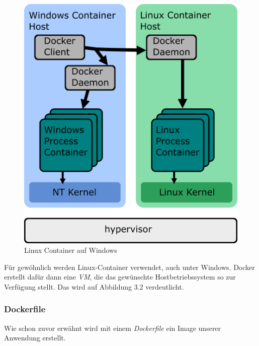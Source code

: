 \documentclass[12pt,a4paper]{scrartcl}
\begin{document}
\begin{figure}[h!]
	\centering
	\includegraphics[scale=2]{DockerWindows.png}
	\caption[https://docs.microsoft.com/de-de/virtualization/windowscontainers/deploy-containers/linux-containers (Stand 25.09.2020)]{Linux Container auf Windows}
\end{figure}

Für gewöhnlich werden Linux-Container verwendet, auch unter Windows. Docker erstellt dafür dann eine \emph{VM}, die das gewünschte Hostbetriebssystem so zur Verfügung stellt. Das wird auf Abbildung 3.2 verdeutlicht. 

\subsubsection{Dockerfile}

Wie schon zuvor erwähnt wird mit einem \emph{Dockerfile} ein Image unserer Anwendung erstellt.\cite{docImg}
\end{document}
